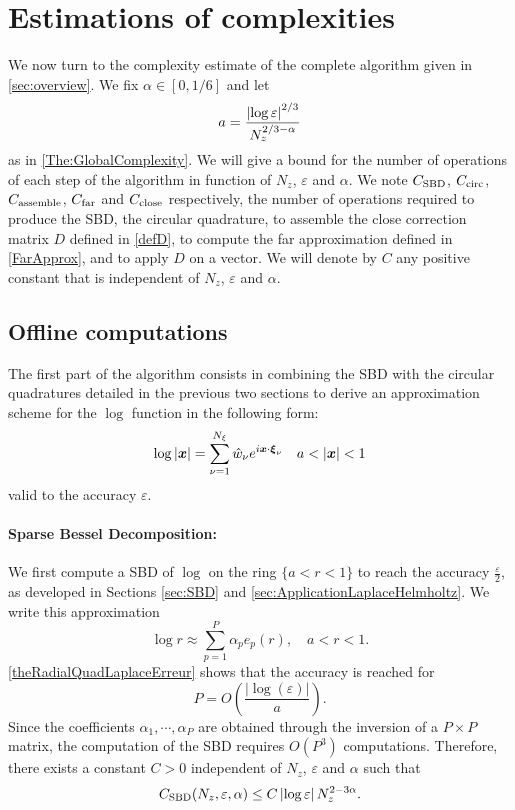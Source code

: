 \documentclass[smallextended]{svjour3}
\begin{document}
	
																																																	
																																																		
\section{Estimations of complexities}
\label{sec:complexities}
We now turn to the complexity estimate of the complete algorithm given in \autoref{sec:overview}. We fix $\alpha \in [0,1/6]$ and let 
\begin{equation}
	\label{def_a}
	a = \dfrac{\left\lvert \log\varepsilon \right\rvert^{2/3}}{N_z^{2/3 - \alpha}}
\end{equation}  
as in \autoref{The:GlobalComplexity}. We will give a bound for the number of operations of each step of the algorithm in function of $N_z$, $\varepsilon$ and $\alpha$. We note  $C_{\textup{SBD}}$, $C_{\textup{circ}}$, $C_{\textup{assemble}}$, $C_{\textup{far}}$ and $C_{\textup{close}}$ respectively, the number of operations required  to produce the SBD, the circular quadrature, to assemble the close correction matrix $D$ defined in \eqref{defD}, to compute the far approximation defined in \eqref{FarApprox}, and to apply $D$ on a vector. We will denote by $C$ any positive constant that is independent of $N_z$, $\varepsilon$ and $\alpha$. 
\subsection{Offline computations}
The first part of the algorithm consists in combining the SBD with the circular quadratures detailed in the previous two sections to derive an approximation scheme for the $\log$ function in the following form: 
\[ \log |\boldsymbol{x}| = \sum_{\nu=1}^{N_\xi} \hat{w}_{\nu} e^{i \boldsymbol{x}\cdot \boldsymbol{\xi}_{\nu}} \quad a < \left\lvert \boldsymbol{x} \right\rvert < 1\]
valid to the accuracy $\varepsilon$.
																																																		
\paragraph{Sparse Bessel Decomposition:}
We first compute a SBD of $\log$ on the ring $\{a < r < 1\}$ to reach the accuracy $\frac{\varepsilon}{2}$, as  developed in Sections \ref{sec:SBD} and \ref{sec:ApplicationLaplaceHelmholtz}. We write this approximation
\[ \log r \approx \sum_{p=1}^P \alpha_p e_p(r), \quad a < r < 1.\]
\autoref{theRadialQuadLaplaceErreur} shows that the accuracy is reached for 
\begin{equation}
	\label{eq:valeurDePenFonctionDe_a}
	P = O\left(\dfrac{|\log(\varepsilon)|}{a}\right).
\end{equation}
Since the coefficients $\alpha_1,\cdots,\alpha_P$ are obtained through the inversion of a $P \times P$ matrix, the computation of the SBD requires $O(P^3)$ computations. Therefore, there exists a constant $C>0$ independent of $N_z$, $\varepsilon$ and $\alpha$ such that 
\begin{equation}
	\label{Complex:SBD}
	C_{\textup{SBD}}(N_z,\varepsilon,\alpha) \leq C \left\lvert \log\varepsilon \right\rvert N_z^{2 - 3\alpha}.
\end{equation}
																																																		
\end{document}
